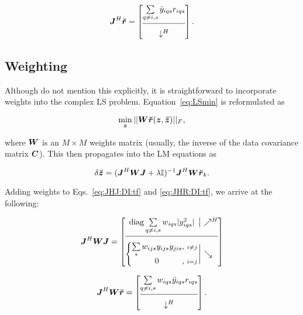 \documentclass[useAMS,usenatbib]{mn2e}
\newcommand{\II}{\mathbb{I}}
\newcommand{\mat}[1]{{\bmath{#1}}}
\newcommand{\JJ}{\mat{J}} %
\begin{document}
\begin{equation}
\label{eq:JHR:DI:tf}
\JJ^H\Rr 
= \Matrix{c}{
\sum\limits_{q\ne i,s} \bar{y}_{iqs} r_{iqs}   \\
 \hline \\[-8pt]
\downarrow^H
}.
\end{equation}

\subsection{Weighting}
\label{sec:DI:W}

Although \citet{ComplexOpt} do not mention this explicitly, it is straightforward to incorporate weights into the 
complex LS problem. Equation~\ref{eq:LSmin} is reformulated as

\begin{equation}
\label{eq:LSmin:w}
\min_{\bmath{z}} ||\mat{W} \Rr(\bmath{z},\bmath{\bar z})||_F,
\end{equation}

where $\mat{W}$ is an $M\times M$ weights matrix (usually, the inverse of the data covariance matrix $\mat{C}$). This then propagates into the LM equations as

\begin{equation}
\label{eq:LM:W}
\delta\Zz = (\JJ^H \mat{W} \JJ + \lambda\II)^{-1}\JJ^H \mat{W} \Rr_k.
\end{equation}

Adding weights to Eqs.~\ref{eq:JHJ:DI:tf} and \ref{eq:JHR:DI:tf}, we arrive at the following:


\begin{equation}
\label{eq:JHJ:DI:tfw}
\JJ^H\mat{W}\JJ = 
\JHJblocks{
  \mathrm{diag} \sum\limits_{q\ne i,s} w_{iqs} |y^2_{iqs}|
}{
  \left \{ 
  \begin{array}{@{}c@{,~}c@{}}
   \sum\limits_{s} w_{ijs} y_{ijs}y_{jis}&{\scriptstyle i\ne j} \\
   0 &{\scriptstyle i=j}
  \end{array} \right . 
}
\end{equation}

\begin{equation}
\label{eq:JHR:DI:tfw}
\JJ^H\mat{W}\Rr 
= \Matrix{c}{
\sum\limits_{q\ne i,s} w_{iqs} \bar{y}_{iqs} r_{iqs}   \\
\hline\\[-8pt]
\downarrow^H
}.
\end{equation}
\end{document}

